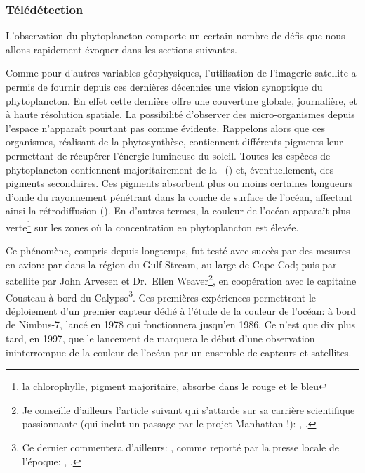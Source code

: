 
\begin{figure}
  \centering
  \label{fig:pompe-bio}
\end{figure}

\subsubsection{Télédétection}
\label{sec:teledetection}

L'observation du phytoplancton comporte un certain nombre de défis que nous allons rapidement évoquer dans les sections suivantes.

Comme pour d'autres variables géophysiques, l'utilisation de l'imagerie satellite a permis de fournir depuis ces dernières décennies une vision synoptique du phytoplancton.
En effet cette dernière offre une couverture globale, journalière, et à haute résolution spatiale.
La possibilité d'observer des micro-organismes depuis l'espace n'apparaît pourtant pas comme évidente.
Rappelons alors que ces organismes, réalisant de la phytosynthèse, contiennent différents pigments leur permettant de récupérer l'énergie lumineuse du soleil.
Toutes les espèces de phytoplancton contiennent majoritairement de la ~() et, éventuellement, des pigments secondaires.
Ces pigments absorbent plus ou moins certaines longueurs d'onde du rayonnement pénétrant dans la couche de surface de l'océan, affectant ainsi la rétrodiffusion ().
En d'autres termes, la couleur de l'océan apparaît plus verte\footnote{%
  la chlorophylle, pigment majoritaire, absorbe dans le rouge et le bleu}
sur les zones où la concentration en phytoplancton est élevée.

Ce phénomène, compris depuis longtemps, fut testé avec succès par des mesures en avion:  par \textcite{clarke_1970} dans la région du Gulf Stream, au large de Cape Cod; puis par satellite par John Arvesen et Dr.\ Ellen Weaver\footnote{%
  Je conseille d'ailleurs l'article suivant qui s'attarde sur sa carrière scientifique passionnante (qui inclut un passage par le projet Manhattan !): , \cite{marshall_2010}.},
en coopération avec le capitaine Cousteau à bord du Calypso\footnote{%
  Ce dernier commentera d'ailleurs: , comme reporté par la presse locale de l'époque:
  , \cite{macomber_1973}.
}.
Ces premières expériences permettront le déploiement d'un premier capteur dédié à l'étude de la couleur de l'océan:  à bord de Nimbus-7, lancé en 1978 qui fonctionnera jusqu'en 1986.
Ce n'est que dix plus tard, en 1997, que le lancement de  marquera le début d'une observation ininterrompue de la couleur de l'océan par un ensemble de capteurs et satellites.

